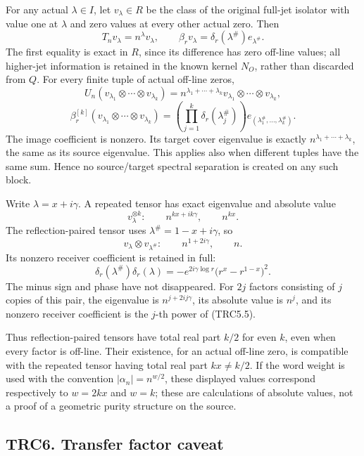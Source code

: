 For any actual \(\lambda\in I\), let \(v_\lambda\in R\) be the class of
the original full-jet isolator with value one at \(\lambda\) and zero
values at every other actual zero. Then \[
T_nv_\lambda=n^\lambda v_\lambda,\qquad
\beta_rv_\lambda=\delta_r(\lambda^\#)e_{\lambda^\#}.
\tag{TRC5.1}
\] The first equality is exact in \(R\), since its difference has zero
off-line values; all higher-jet information is retained in the known
kernel \(N_O\), rather than discarded from \(Q\). For every finite tuple
of actual off-line zeros, \[
U_n(v_{\lambda_1}\otimes\cdots\otimes v_{\lambda_k})
=n^{\lambda_1+\cdots+\lambda_k}
v_{\lambda_1}\otimes\cdots\otimes v_{\lambda_k},
\] \[
\beta_r^{[k]}(v_{\lambda_1}\otimes\cdots\otimes v_{\lambda_k})
=\left(\prod_{j=1}^k\delta_r(\lambda_j^\#)\right)
e_{(\lambda_1^\#,\ldots,\lambda_k^\#)}.
\tag{TRC5.2}
\] The image coefficient is nonzero. Its target cover eigenvalue is
exactly \(n^{\lambda_1+\cdots+\lambda_k}\), the same as its source
eigenvalue. This applies also when different tuples have the same sum.
Hence no source/target spectral separation is created on any such block.

Write \(\lambda=x+i\gamma\). A repeated tensor has exact eigenvalue and
absolute value \[
v_\lambda^{\otimes k}:\qquad n^{kx+ik\gamma},\qquad n^{kx}.
\tag{TRC5.3}
\] The reflection-paired tensor uses \(\lambda^\#=1-x+i\gamma\), so \[
v_\lambda\otimes v_{\lambda^\#}:\qquad
n^{1+2i\gamma},\qquad n.
\tag{TRC5.4}
\] Its nonzero receiver coefficient is retained in full: \[
\delta_r(\lambda^\#)\delta_r(\lambda)
=-e^{2i\gamma\log r}\bigl(r^x-r^{1-x}\bigr)^2.
\tag{TRC5.5}
\] The minus sign and phase have not disappeared. For \(2j\) factors
consisting of \(j\) copies of this pair, the eigenvalue is
\(n^{j+2ij\gamma}\), its absolute value is \(n^j\), and its nonzero
receiver coefficient is the \(j\)-th power of (TRC5.5).

Thus reflection-paired tensors have total real part \(k/2\) for even
\(k\), even when every factor is off-line. Their existence, for an
actual off-line zero, is compatible with the repeated tensor having
total real part \(kx\ne k/2\). If the word weight is used with the
convention \(|\alpha_n|=n^{w/2}\), these displayed values correspond
respectively to \(w=2kx\) and \(w=k\); these are calculations of
absolute values, not a proof of a geometric purity structure on the
source.

\subsection{TRC6. Transfer factor
caveat}\label{trc6.-transfer-factor-caveat}

